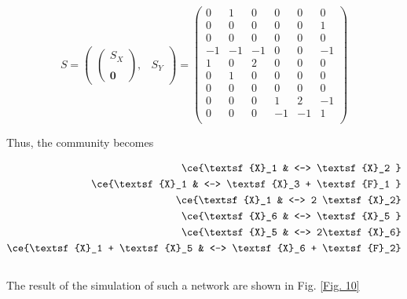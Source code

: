 \documentclass{article}
\begin{document}
\begin{center}
\begin{equation}
    S = \begin{pmatrix}
        \begin{pmatrix}
            S_X \\ \\
            \pmb{0}
        \end{pmatrix}, & S_Y
    \end{pmatrix} = \begin{pmatrix}
0 & 1 & 0 & 0 & 0 & 0 \\
0 & 0 & 0 & 0 & 0 & 1 \\
0 & 0 & 0 & 0 & 0 & 0 \\
-1 & -1 & -1 & 0 & 0 & -1 \\
1 & 0 & 2 & 0 & 0 & 0 \\
0 & 1 & 0 & 0 & 0 & 0 \\
0 & 0 & 0 & 0 & 0 & 0 \\
0 & 0 & 0 & 1 & 2 & -1 \\
0 & 0 & 0 & -1 & -1 & 1 \\
\end{pmatrix}
\end{equation}
\end{center}

Thus, the community becomes

\begin{equation}
		\begin{split}
\ce{\textsf{X}_1 & <--> \textsf{X}_2 }\\ 
\ce{\textsf{X}_1 & <--> \textsf{X}_3 + \textsf{F}_1 }\\ 
\ce{\textsf{X}_1 & <--> 2 \textsf{X}_2}\\ 
\ce{\textsf{X}_6 & <--> \textsf{X}_5 }\\ 
\ce{\textsf{X}_5 & <--> 2\textsf{X}_6}\\ 
\ce{\textsf{X}_1 + \textsf{X}_5 & <--> \textsf{X}_6 + \textsf{F}_2}\\ 
\end{split} 
\end{equation}
\\

The result of the simulation of such a network are shown in Fig. \ref{Fig. 10}
\end{document}
